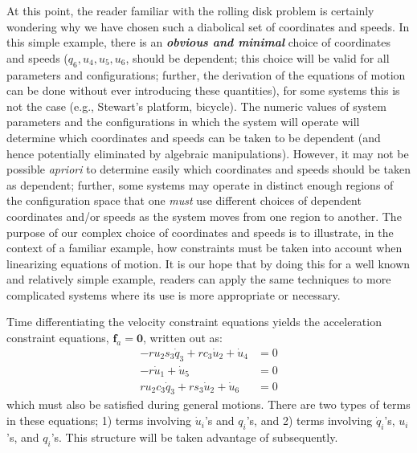 \documentclass[smallcondensed,final]{svjour3}                     %
\begin{document}
At this point, the reader familiar with the rolling disk problem is certainly
wondering why we have chosen such a diabolical set of coordinates and speeds.
In this simple example, there is an {\bf \textit{obvious and minimal}} choice of
coordinates and speeds ($q_6, u_4, u_5, u_6$, should be dependent; this choice
will be valid for all parameters and configurations; further, the derivation of
the equations of motion can be done without ever introducing these quantities),
for some systems this is not the case (e.g., Stewart's platform, bicycle). The
numeric values of system parameters and the configurations in which the system
will operate will determine which coordinates and speeds can be taken to be
dependent (and hence potentially eliminated by algebraic manipulations).
However, it may not be possible \textit{apriori} to determine easily which
coordinates and speeds should be taken as dependent; further, some systems may
operate in distinct enough regions of the configuration space that one
\textit{must} use different choices of dependent coordinates and/or speeds as
the system moves from one region to another. The purpose of our complex
choice of coordinates and speeds is to illustrate, in the context of a familiar
example, how constraints must be taken into account when linearizing equations
of motion. It is our hope that by doing this for a well known and relatively
simple example, readers can apply the same techniques to more complicated
systems where its use is more appropriate or necessary.

Time differentiating the velocity constraint equations yields the acceleration
constraint equations, $\mathbf{f}_a = \mathbf{0}$, written out as:
\begin{subequations}
\label{rd:f_a}
\begin{align}
    -r u_{2} s_3 \dot{q}_{3} + r c_3 \dot{u}_{2} + \dot{u}_{4} &=
    0\\
    - r \dot{u}_{1} + \dot{u}_{5} &= 0\\
    r u_{2} c_3 \dot{q}_{3} + r s_3 \dot{u}_{2} + \dot{u}_{6} &=
    0
\end{align}
\end{subequations}
which must also be satisfied during general motions. There are two types of
terms in these equations; 1) terms involving $\dot{u}_i$'s and $q_i$'s, and 2)
terms involving $\dot{q}_i$'s, $u_i$'s, and $q_i$'s. This structure will be
taken advantage of subsequently.
\end{document}
